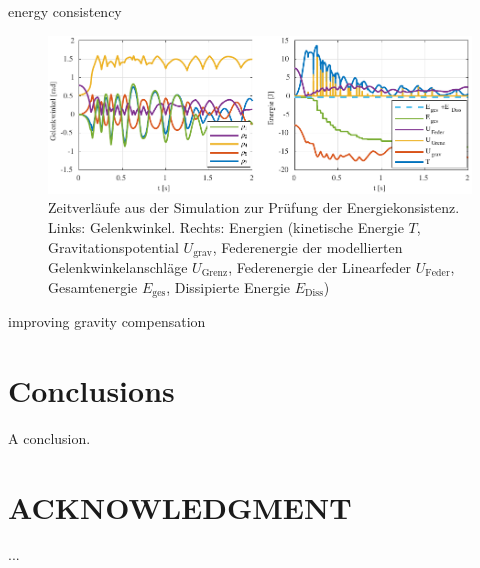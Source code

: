 \documentclass[letterpaper, 10 pt, conference]{ieeeconf}  %
\begin{document}
energy consistency

\begin{figure}[tb]
    \includegraphics{figures/KAS5m5_Gelenkgrenzmodell_q_E.pdf} 
    \caption[Zeitverläufe aus der Simulation zur Prüfung der Energiekonsistenz]{Zeitverläufe aus der Simulation zur Prüfung der Energiekonsistenz. Links: Gelenkwinkel. Rechts: Energien (kinetische Energie $T$, Gravitationspotential $U_\mathrm{grav}$, Federenergie der modellierten Gelenkwinkelanschläge $U_\mathrm{Grenz}$, Federenergie der Linearfeder $U_\mathrm{Feder}$, Gesamtenergie $E_\mathrm{ges}$, Dissipierte Energie $E_\mathrm{Diss}$)}
    \label{fig:SimulationEnergiekonsistenz}
\end{figure} 


improving gravity compensation

\section{Conclusions}

A conclusion.

\addtolength{\textheight}{-12cm}   %







%


\section*{ACKNOWLEDGMENT}

...






\end{document}
